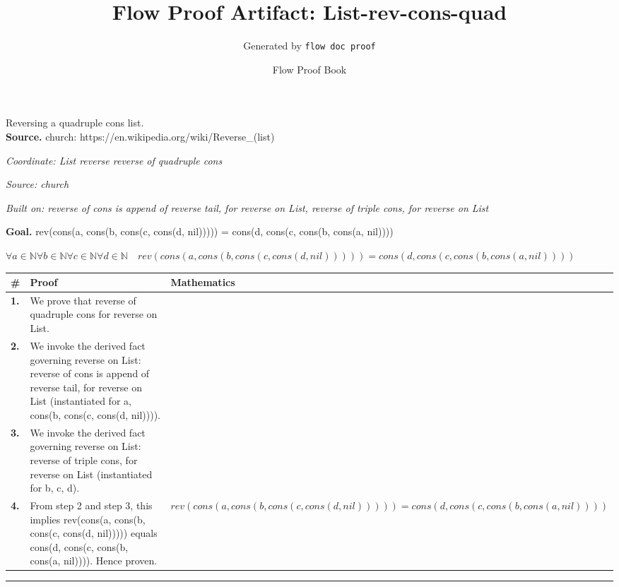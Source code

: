 \documentclass[11pt]{article}
\title{Flow Proof Artifact: List-rev-cons-quad}
\author{Generated by \texttt{flow doc proof}}
\date{Flow Proof Book}
\theoremstyle{definition}
\begin{document}
\maketitle
Reversing a quadruple cons list.\\[0.5em]
\textbf{Source.} church: https://en.wikipedia.org/wiki/Reverse\_(list)\\[0.5em]
\bigskip
{}\par
\smallskip\noindent\textit{Coordinate: List \cdot reverse \cdot reverse of quadruple cons}\par
\smallskip\noindent\textit{Source: church}\par
\smallskip\noindent\textit{Built on: reverse of cons is append of reverse tail, for reverse on List, reverse of triple cons, for reverse on List}\par
\medskip
\noindent\textbf{Goal.} rev(cons(a, cons(b, cons(c, cons(d, nil))))) = cons(d, cons(c, cons(b, cons(a, nil))))\par
\noindent$\displaystyle \forall a \in \mathbb{N} \forall b \in \mathbb{N} \forall c \in \mathbb{N} \forall d \in \mathbb{N}\quad rev(cons(a, cons(b, cons(c, cons(d, nil))))) = cons(d, cons(c, cons(b, cons(a, nil))))$\par
\medskip
\noindent
\begin{tabular}{@{} >{\raggedright\arraybackslash}p{} >{\raggedright\arraybackslash}p{} >{\raggedleft\arraybackslash}p{} @{}}
\textbf{\#} & \textbf{Proof} & \textbf{Mathematics} \\
\midrule
\textbf{1.} & We prove that reverse of quadruple cons for reverse on List. & \\[0.45em]
\textbf{2.} & We invoke the derived fact governing reverse on List: reverse of cons is append of reverse tail, for reverse on List (instantiated for a, cons(b, cons(c, cons(d, nil)))). & \\[0.45em]
\textbf{3.} & We invoke the derived fact governing reverse on List: reverse of triple cons, for reverse on List (instantiated for b, c, d). & \\[0.45em]
\textbf{4.} & From step 2 and step 3, this implies rev(cons(a, cons(b, cons(c, cons(d, nil))))) equals cons(d, cons(c, cons(b, cons(a, nil)))). Hence proven. & $\displaystyle rev(cons(a, cons(b, cons(c, cons(d, nil))))) = cons(d, cons(c, cons(b, cons(a, nil))))$ \\[0.45em]
\bottomrule
\end{tabular}
\label{thm:List-reverse-reverse_of_quadruple_cons}
\par\medskip\hrule
\end{document}
